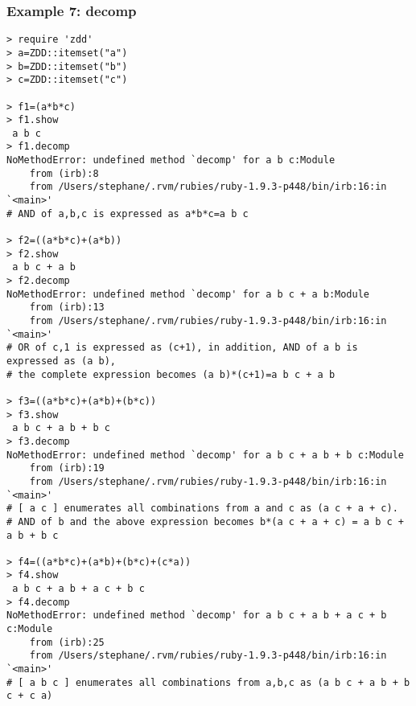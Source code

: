 \subsubsection*{Example 7: decomp}



\begin{Verbatim}[baselinestretch=0.7,frame=single]
> require 'zdd'
> a=ZDD::itemset("a")
> b=ZDD::itemset("b")
> c=ZDD::itemset("c")

> f1=(a*b*c)
> f1.show
 a b c
> f1.decomp
NoMethodError: undefined method `decomp' for a b c:Module
	from (irb):8
	from /Users/stephane/.rvm/rubies/ruby-1.9.3-p448/bin/irb:16:in `<main>'
# AND of a,b,c is expressed as a*b*c=a b c

> f2=((a*b*c)+(a*b))
> f2.show
 a b c + a b
> f2.decomp
NoMethodError: undefined method `decomp' for a b c + a b:Module
	from (irb):13
	from /Users/stephane/.rvm/rubies/ruby-1.9.3-p448/bin/irb:16:in `<main>'
# OR of c,1 is expressed as (c+1), in addition, AND of a b is expressed as (a b),
# the complete expression becomes (a b)*(c+1)=a b c + a b

> f3=((a*b*c)+(a*b)+(b*c))
> f3.show
 a b c + a b + b c
> f3.decomp
NoMethodError: undefined method `decomp' for a b c + a b + b c:Module
	from (irb):19
	from /Users/stephane/.rvm/rubies/ruby-1.9.3-p448/bin/irb:16:in `<main>'
# [ a c ] enumerates all combinations from a and c as (a c + a + c).
# AND of b and the above expression becomes b*(a c + a + c) = a b c + a b + b c

> f4=((a*b*c)+(a*b)+(b*c)+(c*a))
> f4.show
 a b c + a b + a c + b c
> f4.decomp
NoMethodError: undefined method `decomp' for a b c + a b + a c + b c:Module
	from (irb):25
	from /Users/stephane/.rvm/rubies/ruby-1.9.3-p448/bin/irb:16:in `<main>'
# [ a b c ] enumerates all combinations from a,b,c as (a b c + a b + b c + c a)

\end{Verbatim}
